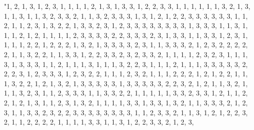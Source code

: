 \documentclass[
]{article}
\begin{document}
\begin{Schunk}
\begin{Soutput}
                                                                                                                                                                                                                                                                                                                                                                                                                                                                                                                                                                                                                                                                                                                                                                                                                                                                                                                                                                                                                                                                                                                                                                                                                                                                                                                                                                                                                                                                                                                                                                                                                                                                                                                                                                                                                                                                                                                                                                                                                                                                                                                                                            "1, 2, 1, 3, 1, 2, 3, 1, 1, 1, 1, 2, 1, 3, 1, 3, 3, 1, 2, 2, 3, 3, 1, 1, 1, 1, 1, 1, 3, 2, 1, 3, 1, 1, 3, 1, 1, 3, 2, 3, 3, 2, 1, 1, 3, 2, 3, 3, 3, 1, 3, 1, 2, 1, 2, 2, 3, 3, 3, 3, 3, 3, 1, 1, 2, 1, 1, 2, 3, 1, 3, 2, 2, 1, 3, 3, 2, 3, 1, 2, 3, 3, 3, 3, 3, 3, 3, 3, 1, 3, 3, 3, 1, 1, 3, 1, 1, 1, 2, 1, 2, 1, 1, 1, 1, 2, 3, 3, 3, 3, 2, 2, 3, 3, 3, 2, 3, 1, 3, 3, 1, 1, 3, 3, 1, 2, 3, 1, 1, 1, 1, 2, 2, 1, 2, 2, 2, 1, 3, 2, 1, 3, 3, 3, 3, 2, 3, 1, 1, 3, 3, 3, 2, 1, 2, 3, 2, 2, 2, 2, 2, 1, 1, 3, 2, 2, 1, 1, 3, 3, 1, 2, 2, 3, 3, 2, 3, 2, 3, 3, 2, 1, 1, 1, 1, 2, 3, 2, 3, 1, 1, 1, 3, 1, 3, 3, 3, 1, 1, 2, 1, 1, 1, 3, 1, 1, 1, 3, 2, 2, 3, 1, 1, 1, 2, 1, 1, 1, 3, 3, 3, 3, 3, 2, 2, 2, 3, 1, 2, 3, 3, 3, 1, 2, 3, 2, 2, 1, 1, 1, 2, 3, 2, 1, 1, 1, 2, 2, 2, 1, 2, 1, 2, 2, 1, 1, 1, 3, 2, 2, 1, 2, 1, 3, 2, 1, 3, 3, 3, 3, 3, 1, 3, 3, 3, 3, 3, 2, 2, 3, 2, 1, 2, 1, 1, 3, 2, 1, 1, 1, 3, 2, 3, 1, 1, 2, 3, 3, 3, 1, 1, 3, 3, 2, 2, 1, 1, 1, 1, 1, 3, 3, 2, 3, 3, 1, 2, 1, 1, 2, 2, 1, 2, 1, 3, 1, 1, 2, 3, 1, 3, 2, 1, 1, 1, 1, 3, 3, 1, 3, 3, 1, 3, 2, 1, 1, 3, 3, 3, 2, 1, 2, 3, 1, 1, 3, 3, 2, 3, 2, 2, 3, 3, 3, 3, 3, 3, 3, 3, 1, 1, 2, 3, 3, 2, 1, 1, 3, 1, 2, 1, 2, 2, 3, 2, 1, 1, 2, 2, 2, 2, 1, 1, 1, 1, 3, 3, 1, 1, 3, 1, 2, 2, 3, 3, 2, 1, 2, 3, 
\end{Soutput}
\end{Schunk}
\end{document}

